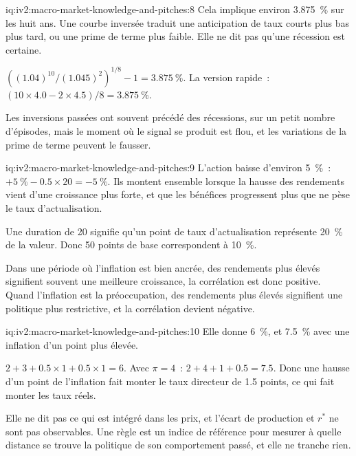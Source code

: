 \begin{solution}{iq:iv2:macro-market-knowledge-and-pitches:8}
Cela implique environ 3.875~\% sur les huit ans. Une courbe inversée traduit une anticipation de taux courts plus bas plus tard, ou une prime de terme plus faible. Elle ne dit pas qu'une récession est certaine.

$((1.04)^{10}/(1.045)^2)^{1/8} - 1 = 3.875~\%$. La version rapide~: $(10 \times 4.0 - 2 \times 4.5)/8 = 3.875~\%$.

Les inversions passées ont souvent précédé des récessions, sur un petit nombre d'épisodes, mais le moment où le signal se produit est flou, et les variations de la prime de terme peuvent le fausser.

\end{solution}

\begin{solution}{iq:iv2:macro-market-knowledge-and-pitches:9}
L'action baisse d'environ 5~\%~: $+5~\% - 0.5 \times 20 = -5~\%$. Ils montent ensemble lorsque la hausse des rendements vient d'une croissance plus forte, et que les bénéfices progressent plus que ne pèse le taux d'actualisation.

Une duration de 20 signifie qu'un point de taux d'actualisation représente 20~\% de la valeur. Donc 50 points de base correspondent à 10~\%.

Dans une période où l'inflation est bien ancrée, des rendements plus élevés signifient souvent une meilleure croissance, la corrélation est donc positive. Quand l'inflation est la préoccupation, des rendements plus élevés signifient une politique plus restrictive, et la corrélation devient négative.

\end{solution}

\begin{solution}{iq:iv2:macro-market-knowledge-and-pitches:10}
Elle donne 6~\%, et 7.5~\% avec une inflation d'un point plus élevée.

$2 + 3 + 0.5 \times 1 + 0.5 \times 1 = 6$. Avec $\pi = 4$~: $2 + 4 + 1 + 0.5 = 7.5$. Donc une hausse d'un point de l'inflation fait monter le taux directeur de 1.5 points, ce qui fait monter les taux réels.

Elle ne dit pas ce qui est intégré dans les prix, et l'écart de production et $r^*$ ne sont pas observables. Une règle est un indice de référence pour mesurer à quelle distance se trouve la politique de son comportement passé, et elle ne tranche rien.

\end{solution}


